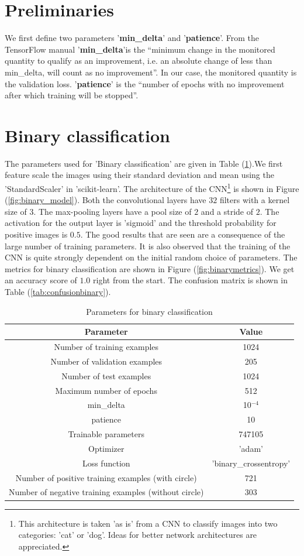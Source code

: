\documentclass{article}
\begin{document}
\section{Preliminaries}
We first define two parameters '\textbf{min\_delta}' and '\textbf{patience}'. From the TensorFlow manual '\textbf{min\_delta}'is the ``minimum change in the monitored quantity to qualify as an improvement, i.e. an absolute change of less than min\_delta, will count as no improvement''. In our case, the monitored quantity is the validation loss. '\textbf{patience}' is the ``number of epochs with no improvement after which training will be stopped''.
\section{Binary classification}
 The parameters used for 'Binary classification' are given in Table (\ref{tab:binaryparam}).We first feature scale the images using their standard deviation and mean using the 'StandardScaler' in 'scikit-learn'. The architecture of the CNN\footnote{This architecture is taken 'as is' from a CNN to classify images into two categories: 'cat' or 'dog'. Ideas for better network architectures are appreciated.} is shown in Figure (\ref{fig:binary_model}). Both the convolutional layers have $32$ filters with a kernel size of $3$. The max-pooling layers have a pool size of $2$ and a stride of $2$. The activation for the output layer is 'sigmoid' and the threshold probability for positive images is $0.5$. The good results that are seen are a consequence of the large number of training parameters. It is also observed that the training of the CNN is quite strongly dependent on the initial random choice of parameters. The metrics for binary classification are shown in Figure (\ref{fig:binarymetrics}). We get an accuracy score of $1.0$ right from the start. The confusion matrix is shown in Table (\ref{tab:confusionbinary}). 
\begin{table}
  \centering
  \begin{tabular}{|c|c|}
    \hline
    Parameter & Value \\
    \hline
    Number of training examples   & 1024 \\
    Number of validation examples & 205 \\
    Number of test examples       & 1024 \\
    Maximum number of epochs      & 512 \\
    min{\_}delta      & 10$^{-4}$\\
    patience                      & 10  \\
    Trainable parameters          & 747105\\
    Optimizer         & 'adam'     \\
    Loss function     & 'binary\_crossentropy' \\
    Number of positive training examples (with circle) & 721\\
    Number of negative training examples (without circle) & 303\\
    \hline
  \end{tabular}
  \caption{\label{tab:binaryparam} Parameters for binary classification}
\end{table}
\end{document}
